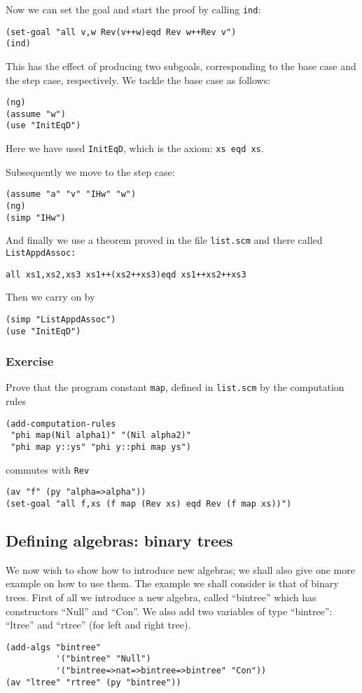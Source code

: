 \documentclass[12pt]{amsart}
\newcommand{\inquotes}[1]{``#1''}
\begin{document}
Now we can set the goal and start the proof by calling \texttt{ind}:
\begin{verbatim}
(set-goal "all v,w Rev(v++w)eqd Rev w++Rev v")
(ind)
\end{verbatim}

This has the effect of producing two subgoals, corresponding to the
base case and the step case, respectively.  We tackle the base case as
follows:
\begin{verbatim}
(ng)
(assume "w")
(use "InitEqD")
\end{verbatim}
Here we have used \texttt{InitEqD}, which is the axiom: \texttt{xs eqd
  xs}.

Subsequently we move to the step case:
\begin{verbatim}
(assume "a" "v" "IHw" "w")
(ng)
(simp "IHw")
\end{verbatim}

And finally we use a theorem proved in the file \texttt{list.scm} and
there called \texttt{ListAppdAssoc:}
\begin{verbatim}
all xs1,xs2,xs3 xs1++(xs2++xs3)eqd xs1++xs2++xs3
\end{verbatim}
Then we carry on by
\begin{verbatim}
(simp "ListAppdAssoc")
(use "InitEqD")
\end{verbatim}

\subsubsection{Exercise}
Prove that the program constant \verb|map|, defined in \texttt{list.scm}
by the computation rules
\begin{verbatim}
(add-computation-rules
 "phi map(Nil alpha1)" "(Nil alpha2)"
 "phi map y::ys" "phi y::phi map ys")
\end{verbatim}
commutes with \texttt{Rev}

\begin{verbatim}
(av "f" (py "alpha=>alpha"))
(set-goal "all f,xs (f map (Rev xs) eqd Rev (f map xs))")
\end{verbatim}

\subsection{Defining algebras: binary trees}
We now wish to show how to introduce new algebras; we shall also give
one more example on how to use them.  The example we shall consider is
that of binary trees.  First of all we introduce a new algebra, called
\inquotes{bintree} which has constructors \inquotes{Null} and
\inquotes{Con}.  We also add two variables of type \inquotes{bintree}:
\inquotes{ltree} and \inquotes{rtree} (for left and right tree).
\begin{verbatim}
(add-algs "bintree"
          '("bintree" "Null")
          '("bintree=>nat=>bintree=>bintree" "Con"))
(av "ltree" "rtree" (py "bintree"))
\end{verbatim}
\end{document}
